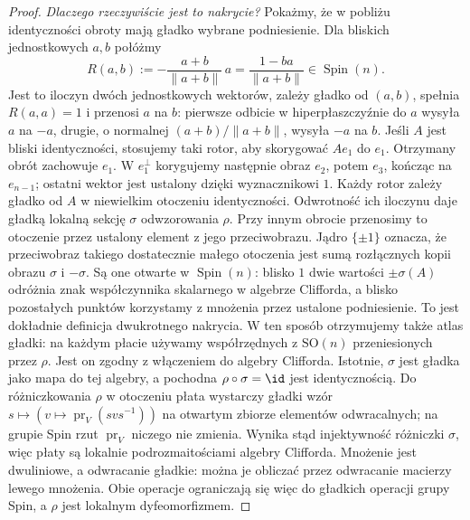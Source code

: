 \begin{proof}
\emph{Dlaczego rzeczywiście jest to nakrycie?}
Pokażmy, że w pobliżu identyczności obroty mają
gładko wybrane podniesienie. Dla bliskich
jednostkowych $a,b$ połóżmy
\[
 R(a,b):=-\frac{a+b}{\|a+b\|}\,a
       =\frac{1-ba}{\|a+b\|}\in\operatorname{Spin}(n).
\]
Jest to iloczyn dwóch jednostkowych wektorów,
zależy gładko od $(a,b)$, spełnia $R(a,a)=1$
i przenosi $a$ na $b$: pierwsze odbicie w
hiperpłaszczyźnie do $a$ wysyła $a$ na $-a$,
drugie, o normalnej $(a+b)/\|a+b\|$, wysyła
$-a$ na $b$. Jeśli $A$ jest bliski identyczności,
stosujemy taki rotor, aby skorygować $Ae_1$ do
$e_1$. Otrzymany obrót zachowuje $e_1$.
W $e_1^\perp$ korygujemy następnie obraz
$e_2$, potem $e_3$, kończąc na $e_{n-1}$;
ostatni wektor jest ustalony dzięki wyznacznikowi
$1$. Każdy rotor zależy gładko od $A$
w niewielkim otoczeniu identyczności.
Odwrotność ich iloczynu daje gładką lokalną
sekcję $\sigma$ odwzorowania $\rho$.
Przy innym obrocie przenosimy to otoczenie
przez ustalony element z jego przeciwobrazu.
Jądro $\{\pm1\}$ oznacza, że przeciwobraz
takiego dostatecznie małego otoczenia jest
sumą rozłącznych kopii obrazu $\sigma$ i $-\sigma$.
Są one otwarte w $\operatorname{Spin}(n)$:
blisko $1$ dwie wartości $\pm\sigma(A)$
odróżnia znak współczynnika skalarnego
w algebrze Clifforda, a blisko pozostałych
punktów korzystamy z mnożenia przez
ustalone podniesienie. To jest dokładnie definicja
dwukrotnego nakrycia.
W ten sposób otrzymujemy także atlas gładki: na każdym płacie
używamy współrzędnych z $\mathrm{SO}(n)$ przeniesionych przez $\rho$.
Jest on zgodny z włączeniem do algebry Clifforda. Istotnie,
$\sigma$ jest gładka jako mapa do tej algebry, a pochodna
$\rho\circ\sigma=\id$ jest identycznością. Do różniczkowania
$\rho$ w otoczeniu płata wystarczy gładki wzór
$s\mapsto(v\mapsto\operatorname{pr}_V(svs^{-1}))$
na otwartym zbiorze elementów odwracalnych; na grupie Spin
rzut $\operatorname{pr}_V$ niczego nie zmienia.
Wynika stąd injektywność różniczki $\sigma$, więc płaty są
lokalnie podrozmaitościami algebry Clifforda. Mnożenie jest
dwuliniowe, a odwracanie gładkie: można je obliczać przez
odwracanie macierzy lewego mnożenia. Obie operacje ograniczają
się więc do gładkich operacji grupy Spin, a $\rho$ jest lokalnym dyfeomorfizmem.
\end{proof}

